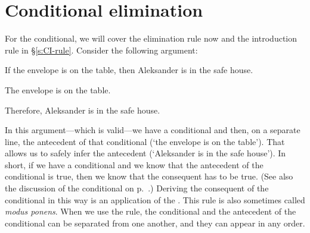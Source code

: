 

\section{Conditional elimination}

For the conditional, we will cover the elimination rule now and the introduction rule in \S \ref{s:CI-rule}. Consider the following argument:
	\begin{earg}
	\item	If the envelope is on the table, then Aleksander is in the safe house.
	\item The envelope is on the table.
	\item Therefore, Aleksander is in the safe house.
	\end{earg}
In this argument---which is valid---we have a conditional and then, on a separate line, the antecedent of that conditional (`the envelope is on the table'). That allows us to safely infer the antecedent (`Aleksander is in the safe house'). In short, if we have a conditional and we know that the antecedent of the conditional is true, then we know that the consequent has to be true. (See also the discussion of the conditional on p.~\pageref{characteristic-tt-conditional}.) Deriving the consequent of the conditional in this way is an application of the .
This rule is also sometimes called \emph{modus ponens}. When we use the rule, the conditional and the antecedent of the conditional can be separated from one another, and they can appear in any order.

